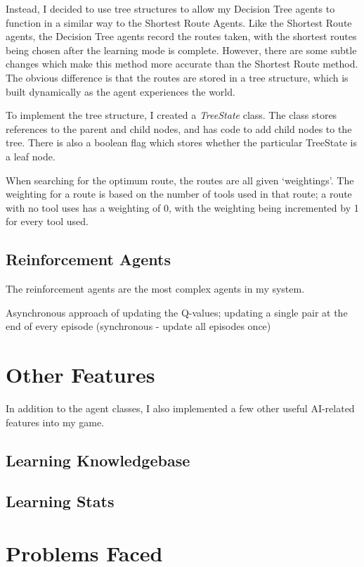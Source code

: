 \documentclass[a4paper,oneside]{report}
\begin{document}
Instead, I decided to use tree structures to allow my Decision Tree agents to function in a similar way to the Shortest Route Agents. Like the Shortest Route agents, the Decision Tree agents record the routes taken, with the shortest routes being chosen after the learning mode is complete. However, there are some subtle changes which make this method more accurate than the Shortest Route method. The obvious difference is that the routes are stored in a tree structure, which is built dynamically as the agent experiences the world. 

To implement the tree structure, I created a \emph{TreeState} class. The class stores references to the parent and child nodes, and has code to add child nodes to the tree. There is also a boolean flag which stores whether the particular TreeState is a leaf node.

When searching for the optimum route, the routes are all given `weightings'. The weighting for a route is based on the number of tools used in that route; a route with no tool uses has a weighting of 0, with the weighting being incremented by 1 for every tool used. 

\subsection{Reinforcement Agents}

The reinforcement agents are the most complex agents in my system.

Asynchronous approach of updating the Q-values; updating a single pair at the end of every episode (synchronous - update all episodes once)

\section{Other Features}

In addition to the agent classes, I also implemented a few other useful AI-related features into my game.

\subsection{Learning Knowledgebase}

\subsection{Learning Stats}

\section{Problems Faced}
	
\end{document}
